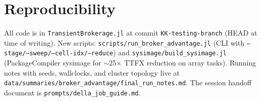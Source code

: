 \documentclass[11pt,a4paper]{article}
\begin{document}
\section*{Reproducibility}
All code is in \texttt{TransientBrokerage.jl} at commit \texttt{KK-testing-branch} (HEAD at time of writing). New scripts: \texttt{scripts/run\_broker\_advantage.jl} (CLI with \texttt{--stage/--sweep/--cell-idx/--reduce}) and \texttt{sysimage/build\_sysimage.jl} (PackageCompiler sysimage for $\sim$25$\times$ TTFX reduction on array tasks). Running notes with seeds, wallclocks, and cluster topology live at \texttt{data/summaries/broker\_advantage/final\_run\_notes.md}. The session handoff document is \texttt{prompts/della\_job\_guide.md}.
\end{document}
